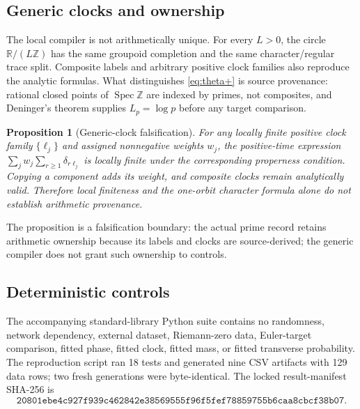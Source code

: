 \documentclass[11pt]{article}
\newtheorem{proposition}[theorem]{Proposition}
\theoremstyle{definition}
\newcommand{\R}{\mathbb{R}}
\newcommand{\Z}{\mathbb{Z}}
\begin{document}
\subsection{Generic clocks and ownership}

The local compiler is not arithmetically unique.  For every \(L>0\), the circle \(\R/(L\Z)\) has the same groupoid completion and the same character/regular trace split.  Composite labels and arbitrary positive clock families also reproduce the analytic formulas.  What distinguishes \eqref{eq:theta+} is source provenance: rational closed points of \(\operatorname{Spec}\Z\) are indexed by primes, not composites, and Deninger's theorem supplies \(L_p=\log p\) before any target comparison.

\begin{proposition}[Generic-clock falsification]\label{prop:generic}
For any locally finite positive clock family \(\{\ell_j\}\) and assigned nonnegative weights \(w_j\), the positive-time expression \(\sum_jw_j\sum_{r\ge1}\delta_{r\ell_j}\) is locally finite under the corresponding properness condition.  Copying a component adds its weight, and composite clocks remain analytically valid.  Therefore local finiteness and the one-orbit character formula alone do not establish arithmetic provenance.
\end{proposition}

The proposition is a falsification boundary: the actual prime record retains arithmetic ownership because its labels and clocks are source-derived; the generic compiler does not grant such ownership to controls.

\subsection{Deterministic controls}

The accompanying standard-library Python suite contains no randomness, network dependency, external dataset, Riemann-zero data, Euler-target comparison, fitted phase, fitted clock, fitted mass, or fitted transverse probability.  The reproduction script ran 18 tests and generated nine CSV artifacts with 129 data rows; two fresh generations were byte-identical.  The locked result-manifest SHA-256 is
\[
 \texttt{20801ebe4c927f939c462842e38569555f96f5fef78859755b6caa8cbcf38b07}.
\]
\end{document}
